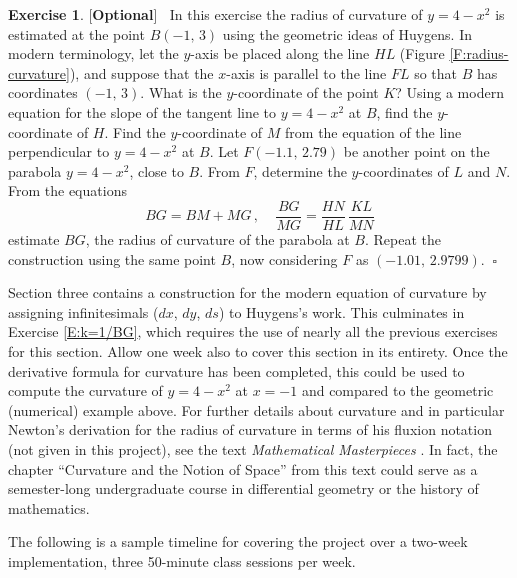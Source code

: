 \documentclass[12pt]{article}
\theoremstyle{definition}
\newtheorem{exercise}{Exercise}[section]
\begin{document}
\begin{exercise}  \label{E:cur.parabola} [{\bf{Optional}}] $\ $
In this exercise the radius of curvature of $y= 4-x^2$ is estimated at
the point $B(-1, \, 3)$ using the geometric ideas of Huygens.  In modern
terminology, let the $y$-axis be placed along the line $HL$ (Figure \ref{F:radius-curvature}), 
and suppose that the $x$-axis is parallel to
the line $FL$ so that $B$ has coordinates $(-1, \, 3)$.  
What is the $y$-coordinate of the point $K$?  
Using a modern equation for the slope of the tangent line to $y=4-x^2$ at $B$, find
the $y$-coordinate of $H$.  Find the $y$-coordinate of $M$ from the
equation of the line perpendicular to $y=4-x^2$ at $B$.  Let 
$F(-1.1,\, 2.79)$ be another point on the parabola $y=4-x^2$, close to $B$.
From $F$, determine the $y$-coordinates of $L$ and $N$.  From the
equations
$$ BG = BM + MG \, , \ \ \ \ \ 
 \frac{BG}{MG} = \frac{HN}{HL} \, \frac{KL}{MN} $$
estimate $BG$, the radius of curvature of the parabola at $B$.  Repeat
the construction using the same point $B$, now considering $F$ as
$(-1.01, \, 2.9799)$.   $\ \square$
\end{exercise}
  

Section three contains a construction for the modern equation of
curvature by assigning infinitesimals ($dx$, $dy$, $ds$) to Huygens's
work.  This culminates in Exercise \eqref{E:k=1/BG}, which requires
the use of nearly all the previous exercises for this section.  
Allow one week also to cover this section in its entirety.
Once the derivative formula for curvature has been completed, this
could be used to compute the curvature of $y = 4 - x^2$ at $x = -1$
and compared to the geometric (numerical) example above.  For further
details about curvature and in particular Newton's derivation for the
radius of curvature in terms of his fluxion notation (not given in
this project), see the text {\em
  Mathematical Masterpieces} \cite{Knoebel}.  In fact, the chapter
``Curvature and the Notion of Space'' from this text \cite{Knoebel} could serve as a
semester-long undergraduate course in differential geometry or the history of
mathematics. 

The following is a sample timeline for covering the project over a two-week implementation,
three 50-minute class sessions per week.
\end{document}
